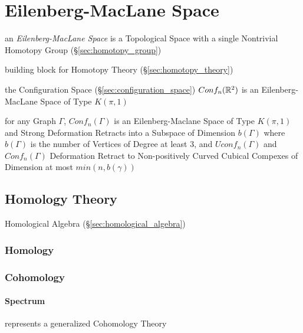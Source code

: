 \section{Eilenberg-MacLane Space}\label{sec:eilenberg_maclane_space}

an \emph{Eilenberg-MacLane Space} is a Topological Space with a single
Nontrivial Homotopy Group (\S\ref{sec:homotopy_group})

building block for Homotopy Theory (\S\ref{sec:homotopy_theory})

the Configuration Space (\S\ref{sec:configuration_space}) $Conf_n(\mathbb{R}^2)$
is an Eilenberg-MacLane Space of Type $K(\pi,1)$

for any Graph $\Gamma$, $Conf_n(\Gamma)$ is an Eilenberg-Maclane Space of Type
$K(\pi,1)$ and Strong Deformation Retracts into a Subspace of Dimension
$b(\Gamma)$ where $b(\Gamma)$ is the number of Vertices of Degree at least 3,
and $Uconf_n(\Gamma)$ and $Conf_n(\Gamma)$ Deformation Retract to
Non-positively Curved Cubical Compexes of Dimension at most $min(n,b(\gamma))$



\subsection{Homology Theory}\label{sec:homology_theory}

Homological Algebra (\S\ref{sec:homological_algebra})



\subsubsection{Homology}\label{sec:homology}

\subsubsection{Cohomology}\label{sec:cohomology}

\paragraph{Spectrum}\label{sec:spectrum}\hfill

represents a generalized Cohomology Theory

